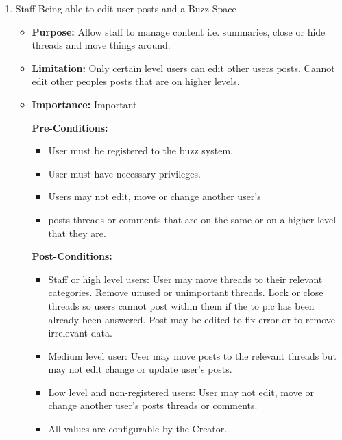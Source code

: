 \documentclass[11pt]{article}
\begin{document}
\begin{enumerate}
\begin{itemize}
	\newpage	 
		 
\end{itemize}			

 \newpage

\item Staff Being able to edit user posts and a Buzz Space
\begin{itemize}	
	\item 
	\textbf{Purpose:}
	\newline
	Allow staff to manage content i.e. summaries, close or hide threads and move things around.
	\item\textbf{Limitation: }
	\newline
	 Only certain level users can edit other users posts.
	 Cannot edit other peoples posts that are on higher levels.
	\item\textbf{Importance:} 
	\newline
	Important
		

	\textbf{Pre-Conditions: }
	\begin{itemize}
		\item User must be registered to the buzz system.
		\item User must have necessary privileges.
		\item Users may not edit, move or change another user’s \item posts threads or comments that are on the same or on a higher level that they are.
	\end{itemize}
	
	\textbf{Post-Conditions: }
	\begin{itemize}
		\item Staff or high level users:
		User may move threads to their relevant categories. Remove unused or unimportant threads. Lock or close threads so users cannot post within them if the to	pic has been already been answered. Post may be edited to fix error or to remove irrelevant data.
		\item Medium level user:
		User may move posts to the relevant threads but may not edit change or update user’s posts.
		\item Low level and non-registered users:
		User may not edit, move or change another user’s posts threads or comments.
	 	\item All values are configurable by the Creator.
	\end{itemize}


\end{itemize}
\end{enumerate}
\end{document}
